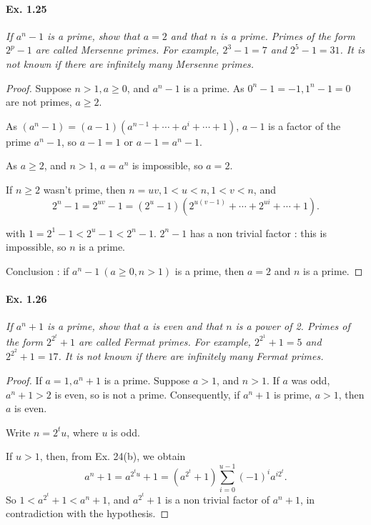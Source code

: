\documentclass[11pt,a4paper]{article}
\begin{document}
{\paragraph{Ex. 1.25}

{\it If $a^n - 1$ is a prime, show that $a = 2$ and that $n$ is a
prime. Primes of the form $2^p - 1$ are called Mersenne primes. For
example, $2^3 - 1 = 7$ and $2^5 - 1 = 31$. It is not known if there are
infinitely many Mersenne primes.
}

\begin{proof}
Suppose $n>1, a\geq 0$, and $a^n - 1$ is a prime. As $0^n -1 = -1,1^n-1 = 0$ are not primes, $a \geq 2$.

As $(a^n-1) = (a-1) (a^{n-1} + \cdots + a^{i} + \cdots  + 1)$, $a-1$ is a factor of the prime $a^n-1$, so $a-1 = 1$ or $a-1 = a^n-1$.

As $a\geq 2$, and $n >1$, $a = a^n$ is impossible, so $a=2$.

If $n\geq 2$ wasn't  prime, then $n = uv, 1 < u <n, 1 < v <n$, and
$$2^n-1 = 2^{uv} - 1 = (2^u -1) (2^{u(v-1)}+ \cdots+2^{ui}+ \cdots+ 1).$$

with $1 = 2^1 - 1<2^u -1 < 2^n-1$. $2^n - 1$ has a non trivial factor : this is impossible, so $n$ is a prime.

Conclusion : if $a^n - 1\ (a \geq 0, n > 1)$ is a prime, then $a = 2$ and $n$ is a prime.
\end{proof}

\paragraph{Ex. 1.26}

{\it If $a^n + 1$ is a prime, show that $a$ is even and that $n$ is a power
of 2. Primes of the form $2^{2^t} + 1$ are called Fermat primes. For
example, $2^{2^1} + 1 = 5$ and $2^{2^2} + 1 = 17$.  It is not known if
there are infinitely many Fermat primes.
}

\begin{proof}
If $a = 1, a^n + 1$ is a prime. Suppose $a >1$, and $n>1$. If $a$ was odd, $a^n+1>2$ is even, so is not a prime. Consequently, if $a^n+1$ is prime, $a>1$, then $a$ is even.

Write $n = 2^t u$, where $u$ is odd.

If $u>1$, then, from Ex. 24(b), we obtain
$$a^n+1 = a^{2^tu}+1 = (a^{2^t} + 1)\sum_{i=0}^{u-1} (-1)^ia^{i2^t}.$$
So $1<a^{2^t} + 1 < a^n+1$, and $a^{2^t} + 1$ is a non trivial factor of $a^n+1$, in contradiction with the hypothesis. 


\end{proof}}
\end{document}
